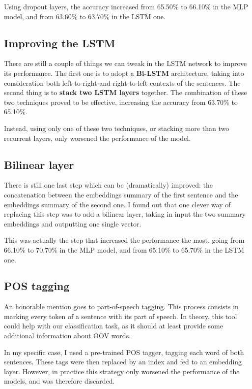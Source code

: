 \documentclass[11pt,a4paper]{article}
\begin{document}
	Using dropout layers, the accuracy increased from 65.50\% to 66.10\% in the MLP model, and from 63.60\% to 63.70\% in the LSTM one.
	
	\subsection{Improving the LSTM}
	There are still a couple of things we can tweak in the LSTM network to improve its performance. The first one is to adopt a \textbf{Bi-LSTM} architecture, taking into consideration both left-to-right and right-to-left contexts of the sentences. The second thing is to \textbf{stack two LSTM layers} together. The combination of these two techniques proved to be effective, increasing the accuracy from 63.70\% to 65.10\%.
	
	 Instead, using only one of these two techniques, or stacking more than two recurrent layers, only worsened the performance of the model.
	
	\subsection{Bilinear layer}
	There is still one last step which can be (dramatically) improved: the concatenation between the embeddings summary of the first sentence and the embeddings summary of the second one. I found out that one clever way of replacing this step was to add a bilinear layer, taking in input the two summary embeddings and outputting one single vector.
	
	This was actually the step that increased the performance the most, going from 66.10\% to 70.70\% in the MLP model, and from 65.10\% to 65.70\% in the LSTM one.
	
	\subsection{POS tagging}
	An honorable mention goes to part-of-speech tagging. This process consists in marking every token of a sentence with its part of speech. In theory, this tool could help with our classification task, as it should at least provide some additional information about OOV words.
	
	In my specific case, I used a pre-trained POS tagger, tagging each word of both sentences. These tags were then replaced by an index and fed to an embedding layer. However, in practice this strategy only worsened the performance of the models, and was therefore discarded.
	
\end{document}
